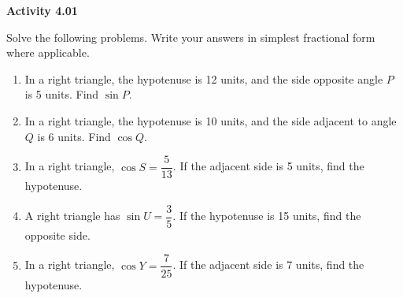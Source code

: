 \vspace{0.3ex}
\noindent\textbf{Activity 4.01}

\vspace{0.2ex}

Solve the following problems. Write your answers in simplest fractional form where applicable.

\begin{enumerate}
    \item In a right triangle, the hypotenuse is 12 units, and the side opposite angle $P$ is 5 units. Find $\sin P$.
    \item In a right triangle, the hypotenuse is 10 units, and the side adjacent to angle $Q$ is 6 units. Find $\cos Q$.
    \item In a right triangle, $\cos S = \dfrac{5}{13}$. If the adjacent side is 5 units, find the hypotenuse.
    \item A right triangle has $\sin U = \dfrac{3}{5}$. If the hypotenuse is 15 units, find the opposite side.
    \item In a right triangle, $\cos Y = \dfrac{7}{25}$. If the adjacent side is 7 units, find the hypotenuse.
\end{enumerate}
